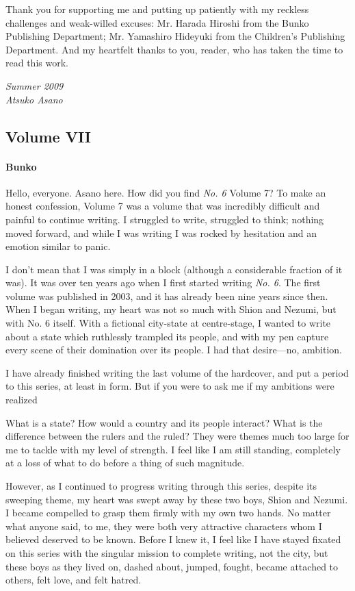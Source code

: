 Thank you for supporting me and putting up patiently with my reckless
challenges and weak-willed excuses: Mr. Harada Hiroshi from the Bunko
Publishing Department; Mr. Yamashiro Hideyuki from the Children's
Publishing Department. And my heartfelt thanks to you, reader, who has
taken the time to read this work.

\myspace

\emph{Summer 2009\\
	Atsuko Asano}

\subsection{Volume VII}
\paragraph{Bunko}

Hello, everyone. Asano here. How did you find \emph{No. 6} Volume 7? To make an honest confession, Volume 7 was a volume that was incredibly difficult and painful to continue writing. I struggled to write, struggled to think; nothing moved forward, and while I was writing I was rocked by hesitation and an emotion similar to panic.

I don't mean that I was simply in a block (although a considerable fraction of it was). It was over ten years ago when I first started writing \emph{No. 6}. The first volume was published in 2003, and it has already been nine years since then. When I began writing, my heart was not so much with Shion and Nezumi, but with No. 6 itself. With a fictional city-state at centre-stage, I wanted to write about a state which ruthlessly trampled its people, and with my pen capture every scene of their domination over its people. I had that desire---no, ambition.

I have already finished writing the last volume of the hardcover, and put a period to this series, at least in form. But if you were to ask me if my ambitions were realized\el 

What is a state? How would a country and its people interact? What is the difference between the rulers and the ruled? They were themes much too large for me to tackle with my level of strength. I feel like I am still standing, completely at a loss of what to do before a thing of such magnitude.

However, as I continued to progress writing through this series, despite its sweeping theme, my heart was swept away by these two boys, Shion and Nezumi. I became compelled to grasp them firmly with my own two hands. No matter what anyone said, to me, they were both very attractive characters whom I believed deserved to be known. Before I knew it, I feel like I have stayed fixated on this series with the singular mission to complete writing, not the city, but these boys as they lived on, dashed about, jumped, fought, became attached to others, felt love, and felt hatred.

